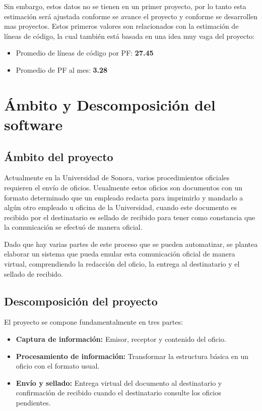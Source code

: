 \documentclass[letterpaper]{article}
\begin{document}
Sin embargo, estos datos no se tienen en un primer proyecto, por lo tanto esta estimación será ajustada conforme se avance el proyecto y conforme se desarrollen mas proyectos. Estos primeros valores son relacionados con la estimación de líneas de código, la cual también está basada en una idea muy vaga del proyecto:

\begin{itemize}
\item Promedio de líneas de código por PF: \textbf{27.45}
\item Promedio de PF al mes: \textbf{3.28}
\end{itemize}

\section{Ámbito y Descomposición del software}
\subsection{Ámbito del proyecto}
Actualmente en la Universidad de Sonora, varios procedimientos oficiales requieren el envío de oficios. Usualmente estos oficios son documentos con un formato determinado que un empleado redacta para imprimirlo y mandarlo a algún otro empleado u oficina de la Universidad, cuando este documento es recibido por el destinatario es sellado de recibido para tener como constancia que la comunicación se efectuó de manera oficial.

Dado que hay varias partes de este proceso que se pueden automatizar, se plantea elaborar un sistema que pueda emular esta comunicación oficial de manera virtual, comprendiendo la redacción del oficio, la entrega al destinatario y el sellado de recibido.

\subsection{Descomposición del proyecto}
El proyecto se compone fundamentalmente en tres partes:
\begin{itemize}
\item \textbf{Captura de información:} Emisor, receptor y contenido del oficio.
\item \textbf{Procesamiento de información:} Transformar la estructura básica en un oficio con el formato usual.
\item \textbf{Envío y sellado:} Entrega virtual del documento al destinatario y confirmación de recibido cuando el destinatario consulte los oficios pendientes.
\end{itemize}
\end{document}
